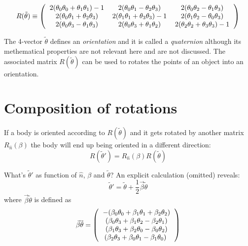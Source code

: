 \documentclass[12pt]{article}
\begin{document}
\begin{equation}
R(\tilde \theta) \equiv \left(\begin{tabular}{ccc}
$2(\theta_0 \theta_0 + \theta_1 \theta_1)-1$ & $2(\theta_0 \theta_1 - \theta_2 \theta_3)$ & $2(\theta_0 \theta_2 - \theta_1 \theta_3) $\\
$2(\theta_0 \theta_1 + \theta_2 \theta_3)$ & $2(\theta_1 \theta_1 +\theta_3 \theta_3)-1$ & $2(\theta_1 \theta_2-\theta_0 \theta_3) $\\
$2(\theta_0 \theta_3 - \theta_1 \theta_3)$ & $2(\theta_0 \theta_3 + \theta_1 \theta_2)$ & $2(\theta_2 \theta_2 + \theta_3 \theta_3)-1$
\end{tabular}\right)
\label{rotation}
\end{equation}

The 4-vector $\tilde \theta$ defines an {\it orientation} and it is called a {\it quaternion} although its methematical properties are not relevant here and are not discussed. The associated matrix $R(\tilde \theta)$ can be used to rotates the points of an object into an orientation.

\section{Composition of rotations}

If a body is oriented according to $R(\tilde \theta)$ and it gets rotated by another matrix $R_{\hat n}(\beta)$ the body will end up being oriented in a different direction:
\begin{equation}
R(\tilde \theta') = R_{\hat n}(\beta) R(\tilde \theta)
\end{equation}

What's  $\tilde \theta'$ as function of $\hat n$, $\beta$ and $\tilde \theta$?
An explicit calculation (omitted) reveals:
\begin{equation}
\tilde \theta' = \tilde \theta + \frac{1}{2}\vec \beta \tilde \theta
\label{theta_update}
\end{equation}
where $\vec \beta \tilde \theta$ is defined as 
\begin{equation}
\vec \beta \tilde \theta = \left(\begin{tabular}{c}
$- (\beta_0 \theta_0 + \beta_1 \theta_1 + \beta_2 \theta_2)$ \\
$(\beta_0 \theta_3 + \beta_1 \theta_2 - \beta_2 \theta_1)$ \\ 
$(\beta_1 \theta_3 + \beta_2 \theta_0 - \beta_0 \theta_2)$ \\ 
$(\beta_2 \theta_3 + \beta_0 \theta_1 - \beta_1 \theta_0)$ 
\label{vxq}
\end{tabular}\right)
\end{equation}
\end{document}
